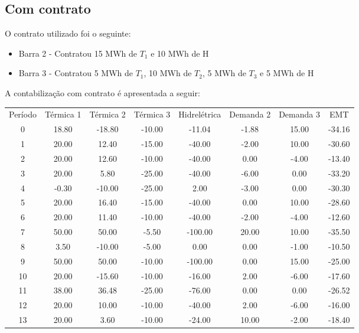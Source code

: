 \documentclass[a4paper,12pt,twoside]{article}
\begin{document}
\subsection{Com contrato}
O contrato utilizado foi o seguinte:
\begin{itemize}
    \item{Barra 2 - Contratou 15 MWh de \(T_1\) e 10 MWh de H}
    \item{Barra 3 - Contratou 5 MWh de \(T_1\), 10 MWh de \(T_2\), 5 MWh de \(T_3\) e 5 MWh de H}
\end{itemize}

A contabilização com contrato é apresentada a seguir:
\begin{center}
    \begin{tabular}{ c c c c c c c c }
        Período & Térmica 1  & Térmica 2  & Térmica 3  & Hidrelétrica  & Demanda 2  & Demanda 3 & EMT \\
        0    & 18.80   & -18.80   & -10.00  & -11.04   & -1.88   & 15.00 & -34.16 \\
        1    & 20.00    & 12.40   & -15.00  & -40.00   & -2.00   & 10.00 & -30.60 \\
        2    & 20.00    & 12.60   & -10.00  & -40.00    & 0.00   & -4.00 & -13.40 \\
        3    & 20.00     & 5.80   & -25.00  & -40.00   & -6.00    & 0.00 & -33.20 \\
        4    & -0.30   & -10.00   & -25.00    & 2.00   & -3.00    & 0.00 & -30.30 \\
        5    & 20.00    & 16.40   & -15.00  & -40.00    & 0.00   & 10.00 & -28.60 \\
        6    & 20.00    & 11.40   & -10.00  & -40.00   & -2.00   & -4.00 & -12.60 \\
        7    & 50.00    & 50.00    & -5.50 & -100.00   & 20.00   & 10.00 & -35.50 \\
        8     & 3.50   & -10.00    & -5.00    & 0.00    & 0.00   & -1.00 & -10.50 \\
        9    & 50.00    & 50.00   & -10.00 & -100.00    & 0.00   & 15.00 & -25.00 \\
        10   & 20.00   & -15.60   & -10.00  & -16.00    & 2.00   & -6.00 & -17.60 \\
        11   & 38.00    & 36.48   & -25.00  & -76.00    & 0.00    & 0.00 & -26.52 \\
        12   & 20.00    & 10.00   & -10.00  & -40.00    & 2.00   & -6.00 & -16.00 \\
        13   & 20.00     & 3.60   & -10.00  & -24.00   & 10.00   & -2.00 & -18.40 \\

\end{tabular}
\end{center}
\end{document}
